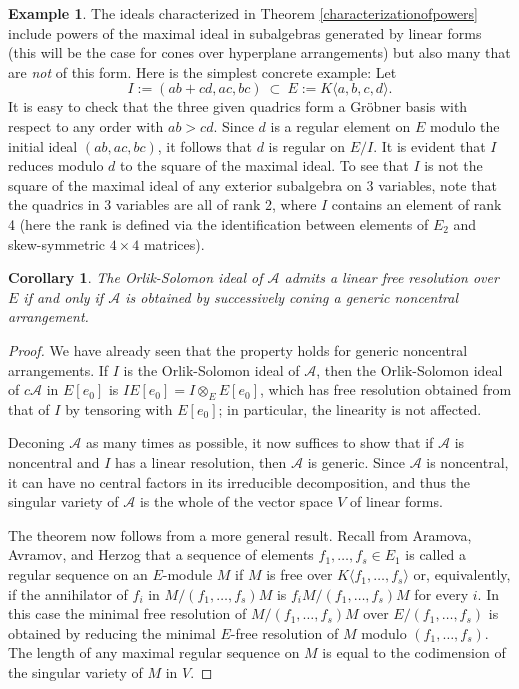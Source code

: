 \documentclass{tran-l}
\newtheorem{corollary}[theorem]{Corollary}
\theoremstyle{definition}
\newtheorem{example}[theorem]{Example}
\theoremstyle{remark}
\newcommand{\Acal}{{{\mathcal A}}}
\begin{document}
\begin{example}\label{nontrivialdefo} The ideals characterized in
Theorem \ref{characterizationofpowers} include  powers of the maximal ideal 
in subalgebras generated by linear forms (this will be the
case for cones over hyperplane arrangements) but also
many that are {\it not\/} of this form. Here is
the simplest concrete example: Let 
\[
I:=(ab+cd, ac, bc)\ \subset \ E:=K\langle a,b,c,d\rangle .
\]
It is easy to check that the three given quadrics form
a Gr\"obner basis with respect to any order with $ab>cd$.
Since $d$ is a regular element on $E$ modulo the initial
ideal $(ab,ac,bc)$, it follows that $d$ is regular on $E/I$.
It is evident that $I$ reduces modulo $d$ to the square of the maximal 
ideal. To see that $I$ is not the square of the maximal ideal
of any exterior subalgebra on 3 variables, note that the quadrics
in 3 variables are all of rank 2, where $I$ contains an element
of rank 4 (here the rank is defined via the identification between
elements of $E_2$ and skew-symmetric $4\times 4$ matrices).
\end{example}

\begin{corollary}\label{characterizationofgeneric} 
The Orlik-Solomon
ideal of $\Acal$ admits a linear free resolution over $E$ if and only if
$\Acal$ is obtained by successively coning a generic noncentral 
arrangement.\end{corollary}

\begin{proof} We have already seen that the property holds for generic
noncentral arrangements. If $I$ is the Orlik-Solomon ideal
of $\Acal$, then the Orlik-Solomon ideal of $c\Acal$ in $E[e_0]$
is $IE[e_0]=I\otimes_EE[e_0]$, which has free resolution obtained
from that of $I$ by tensoring with $E[e_0]$; in particular,
the linearity is not affected. 

Deconing $\Acal$ as many times as possible,  it now suffices to show 
that if $\Acal$ is noncentral and $I$ has a linear resolution, then
$\Acal$ is generic. Since $\Acal$ is noncentral, it can have
no central factors in its irreducible decomposition, and
thus the singular variety of $\Acal$ is the whole of the vector space
$V$ of linear forms. 

The theorem now follows from a more general result. Recall 
from Aramova, Avramov, and Herzog \cite{AAH} that a sequence
of elements $f_1,\dots,f_s\in E_1$ is called a regular sequence on an
$E$-module
$M$ if $M$ is free over $K\langle f_1,\dots,f_s\rangle$ or,
equivalently, if the annihilator of $f_i$ in $M/(f_1,\dots,f_s)M$
is $f_iM/(f_1,\dots,f_s)M$ for every $i$. In this case
the minimal free resolution of $M/(f_1,\dots,f_s)M$ over
$E/(f_1,\dots,f_s)$ is obtained by reducing the minimal 
$E$-free resolution of $M$ modulo $(f_1,\dots,f_s)$. The
length of any maximal regular sequence on $M$ is equal
to the codimension of the singular variety of $M$ in $V$.
\end{proof}
\end{document}
